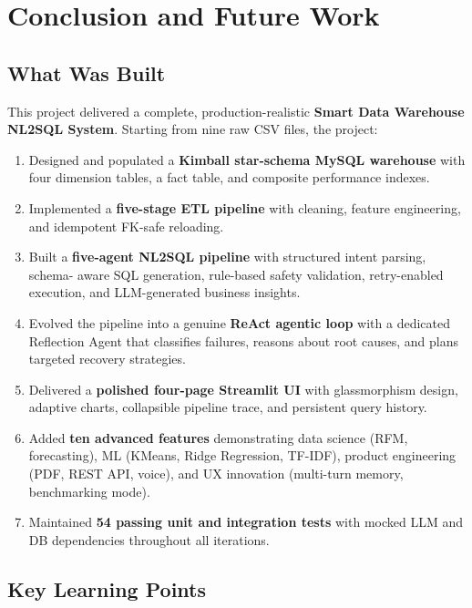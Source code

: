 \documentclass[12pt,a4paper]{report}
\begin{document}
\chapter{Conclusion and Future Work}
\label{ch:conclusion}

\section{What Was Built}

This project delivered a complete, production-realistic \textbf{Smart Data Warehouse NL2SQL
System}. Starting from nine raw CSV files, the project:

\begin{enumerate}
  \item Designed and populated a \textbf{Kimball star-schema MySQL warehouse} with four
        dimension tables, a fact table, and composite performance indexes.
  \item Implemented a \textbf{five-stage ETL pipeline} with cleaning, feature engineering,
        and idempotent FK-safe reloading.
  \item Built a \textbf{five-agent NL2SQL pipeline} with structured intent parsing, schema-
        aware SQL generation, rule-based safety validation, retry-enabled execution, and
        LLM-generated business insights.
  \item Evolved the pipeline into a genuine \textbf{ReAct agentic loop} with a dedicated
        Reflection Agent that classifies failures, reasons about root causes, and plans targeted
        recovery strategies.
  \item Delivered a \textbf{polished four-page Streamlit UI} with glassmorphism design,
        adaptive charts, collapsible pipeline trace, and persistent query history.
  \item Added \textbf{ten advanced features} demonstrating data science (RFM, forecasting),
        ML (KMeans, Ridge Regression, TF-IDF), product engineering (PDF, REST API, voice), and
        UX innovation (multi-turn memory, benchmarking mode).
  \item Maintained \textbf{54 passing unit and integration tests} with mocked LLM and DB
        dependencies throughout all iterations.
\end{enumerate}

\section{Key Learning Points}
\end{document}
